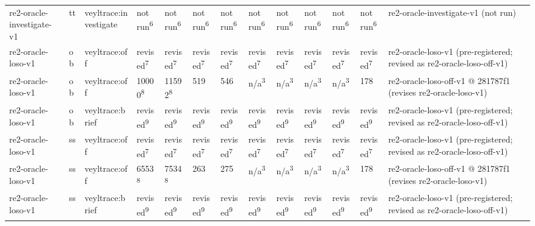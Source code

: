 \begin{table}[t]
\begin{tabular}{lllllllllllll}
re2-oracle-investigate-v1 & tt & veyltrace:investigate & not run\textsuperscript{6} & not run\textsuperscript{6} & not run\textsuperscript{6} & not run\textsuperscript{6} & not run\textsuperscript{6} & not run\textsuperscript{6} & not run\textsuperscript{6} & not run\textsuperscript{6} & not run\textsuperscript{6} & re2-oracle-investigate-v1 (not run) \\
re2-oracle-loso-v1 & ob & veyltrace:off & revised\textsuperscript{7} & revised\textsuperscript{7} & revised\textsuperscript{7} & revised\textsuperscript{7} & revised\textsuperscript{7} & revised\textsuperscript{7} & revised\textsuperscript{7} & revised\textsuperscript{7} & revised\textsuperscript{7} & re2-oracle-loso-v1 (pre-registered; revised as re2-oracle-loso-off-v1) \\
re2-oracle-loso-v1 & ob & veyltrace:off & 10000\textsuperscript{8} & 11592\textsuperscript{8} & 519 & 546 & n/a\textsuperscript{3} & n/a\textsuperscript{3} & n/a\textsuperscript{3} & n/a\textsuperscript{3} & 178 & re2-oracle-loso-off-v1 @ 281787f1 (revises re2-oracle-loso-v1) \\
re2-oracle-loso-v1 & ob & veyltrace:brief & revised\textsuperscript{9} & revised\textsuperscript{9} & revised\textsuperscript{9} & revised\textsuperscript{9} & revised\textsuperscript{9} & revised\textsuperscript{9} & revised\textsuperscript{9} & revised\textsuperscript{9} & revised\textsuperscript{9} & re2-oracle-loso-v1 (pre-registered; revised as re2-oracle-loso-off-v1) \\
re2-oracle-loso-v1 & ss & veyltrace:off & revised\textsuperscript{7} & revised\textsuperscript{7} & revised\textsuperscript{7} & revised\textsuperscript{7} & revised\textsuperscript{7} & revised\textsuperscript{7} & revised\textsuperscript{7} & revised\textsuperscript{7} & revised\textsuperscript{7} & re2-oracle-loso-v1 (pre-registered; revised as re2-oracle-loso-off-v1) \\
re2-oracle-loso-v1 & ss & veyltrace:off & 6553\textsuperscript{8} & 7534\textsuperscript{8} & 263 & 275 & n/a\textsuperscript{3} & n/a\textsuperscript{3} & n/a\textsuperscript{3} & n/a\textsuperscript{3} & 178 & re2-oracle-loso-off-v1 @ 281787f1 (revises re2-oracle-loso-v1) \\
re2-oracle-loso-v1 & ss & veyltrace:brief & revised\textsuperscript{9} & revised\textsuperscript{9} & revised\textsuperscript{9} & revised\textsuperscript{9} & revised\textsuperscript{9} & revised\textsuperscript{9} & revised\textsuperscript{9} & revised\textsuperscript{9} & revised\textsuperscript{9} & re2-oracle-loso-v1 (pre-registered; revised as re2-oracle-loso-off-v1) \\

\end{tabular}
\end{table}
